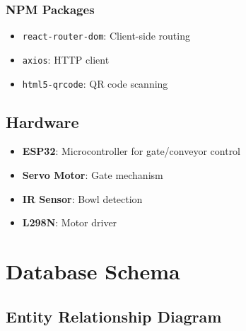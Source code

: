 \documentclass[11pt,a4paper]{report}
\begin{document}
\subsection{NPM Packages}
\begin{itemize}
    \item \texttt{react-router-dom}: Client-side routing
    \item \texttt{axios}: HTTP client
    \item \texttt{html5-qrcode}: QR code scanning
\end{itemize}

\section{Hardware}
\begin{itemize}
    \item \textbf{ESP32}: Microcontroller for gate/conveyor control
    \item \textbf{Servo Motor}: Gate mechanism
    \item \textbf{IR Sensor}: Bowl detection
    \item \textbf{L298N}: Motor driver
\end{itemize}

\chapter{Database Schema}

\section{Entity Relationship Diagram}
\end{document}
